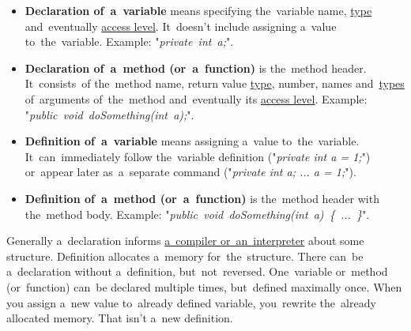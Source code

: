 \label{declarationdefinition}
\begin{itemize}
    \item \textbf{Declaration of~a~variable} means specifying the~variable name, \hyperref[datatypes]{type} and~eventually \hyperref[accessmodifiers]{access level}. It~doesn't include assigning a~value to~the~variable. Example: "\textit{\mbox{private int a;}}".
    \item \textbf{Declaration of~a~method (or~a~function)} is the~method header. It~consists~of the~method name, return value \hyperref[datatypes]{type}, number, names and~\hyperref[datatypes]{types} of~arguments of~the~method and~eventually its \hyperref[accessmodifiers]{access level}. Example: "\textit{\mbox{public void doSomething(int a);}}".
    \item \textbf{Definition of~a~variable} means assigning a~value to~the~variable. It~can~immediately follow the~variable definition ("\textit{private int a = 1;}") or~appear later as~a~separate command ("\textit{private int a; ... a = 1;}").
    \item \textbf{Definition of~a~method (or~a~function)} is the~method header with the~method body. Example: "\textit{\mbox{public void doSomething(int a) \{ ... \}}}".
\end{itemize}
\noindent Generally a~declaration informs \hyperref[compiledinterpretedlanguages]{a~compiler or~an~interpreter} about some structure. Definition allocates a~memory for~the~structure. There can~be a~declaration without a~definition, but~not~reversed. One~variable or~method (or~function) can~be declared multiple times, but~defined maximally once. When you assign a~new value to~already defined variable, you~rewrite the~already allocated memory. That isn't a~new definition.

